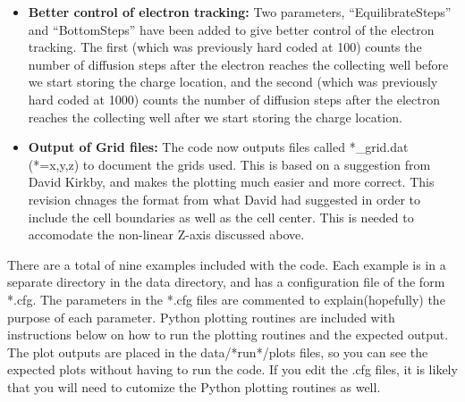 \documentclass{article} %
\makeatletter
\def\section{\@startsection {section}{1}{\z@}{1.0ex plus
1ex minus .2ex}{.2ex plus .2ex}{\large\bf}}
\makeatother
\begin{document}
\begin{itemize}
  \item {\bf Better control of electron tracking:} Two parameters, ``EquilibrateSteps'' and ``BottomSteps'' have been added to give better control of the electron tracking.  The first (which was previously hard coded at 100) counts the number of diffusion steps after the electron reaches the collecting well before we start storing the charge location, and the second (which was previously hard coded at 1000) counts the number of diffusion steps after the electron reaches the collecting well after we start storing the charge location.

    \item {\bf Output of Grid files:} The code now outputs files called *\_grid.dat (*=x,y,z) to document the grids used.  This is based on a suggestion from David Kirkby, and makes the plotting much easier and more correct.  This revision
chnages the format from what David had suggested in order to include the cell boundaries as well as the cell center.  This is needed to accomodate the non-linear Z-axis discussed above.
  
\end{itemize}

\section{Examples}

There are a total of nine examples included with the code.  Each example is in a separate directory in the data directory, and has a configuration file of the form *.cfg. The parameters in the *.cfg files are commented to explain(hopefully) the purpose of each parameter. Python plotting routines are included with instructions below on how to run the plotting routines and the expected output.  The plot outputs are placed in the data/*run*/plots files, so you can see the expected plots without having to run the code.  If you edit the .cfg files, it is likely that you will need to cutomize the Python plotting routines as well.
\end{document}
